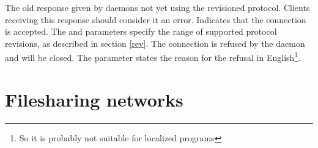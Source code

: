 \documentclass[twoside,a4paper,11pt]{article}
\begin{document}

\noperm

\begin{responses}
  The old response given by daemons not yet using the revisioned
  protocol. Clients receiving this response should consider it an
  error.
  Indicates that the connection is accepted. The  and
   parameters specify the range of supported protocol
  revisions, as described in section \ref{rev}.
  The connection is refused by the daemon and will be closed. The
   parameter states the reason for the refusal in
  English\footnote{So it is probably not suitable for localized
    programs}.
\end{responses}



\section{Filesharing networks}
\label{fnets}
\end{document}
